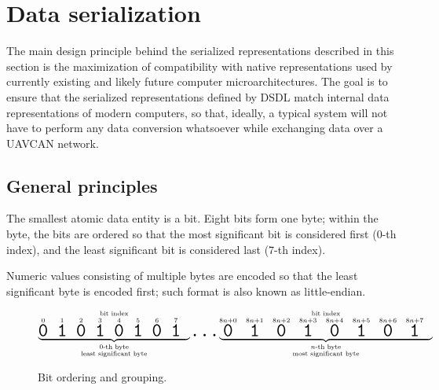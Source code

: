 \section{Data serialization}\label{sec:dsdl_data_serialization}

The main design principle behind the serialized representations described in this section is
the maximization of compatibility with native representations used by currently existing and
likely future computer microarchitectures.
The goal is to ensure that the serialized representations defined by DSDL match internal data representations of
modern computers, so that, ideally, a typical system will not have to perform any data conversion whatsoever while
exchanging data over a UAVCAN network.

\newcommand{\hugett}[1]{\texttt{\huge{#1}}}

\subsection{General principles}

The smallest atomic data entity is a bit.
Eight bits form one byte;
within the byte, the bits are ordered so that the most significant bit is considered first (0-th index),
and the least significant bit is considered last (7-th index).

Numeric values consisting of multiple bytes are encoded so that the least significant byte is encoded first;
such format is also known as little-endian.

\begin{figure}[H]
    $$
    \overset{\text{bit index}}{%
        \underbrace{%
            \overset{0}{\hugett{0}}\quad
            \overset{1}{\hugett{1}}\quad
            \overset{2}{\hugett{0}}\quad
            \overset{3}{\hugett{1}}\quad
            \overset{4}{\hugett{0}}\quad
            \overset{5}{\hugett{1}}\quad
            \overset{6}{\hugett{0}}\quad
            \overset{7}{\hugett{1}}\quad
        }_{\substack{\text{0-th byte} \\ \text{least significant byte}}}%
    }
    \hugett{\ldots}
    \overset{\text{bit index}}{%
        \underbrace{%
            \overset{8n+0}{\hugett{0}}\quad
            \overset{8n+1}{\hugett{1}}\quad
            \overset{8n+2}{\hugett{0}}\quad
            \overset{8n+3}{\hugett{1}}\quad
            \overset{8n+4}{\hugett{0}}\quad
            \overset{8n+5}{\hugett{1}}\quad
            \overset{8n+6}{\hugett{0}}\quad
            \overset{8n+7}{\hugett{1}}\quad
        }_{\substack{n\text{-th byte} \\ \text{most significant byte}}}%
    }
    $$
    \caption{Bit ordering and grouping.\label{fig:dsdl_serialization_bit_ordering}}
\end{figure}

